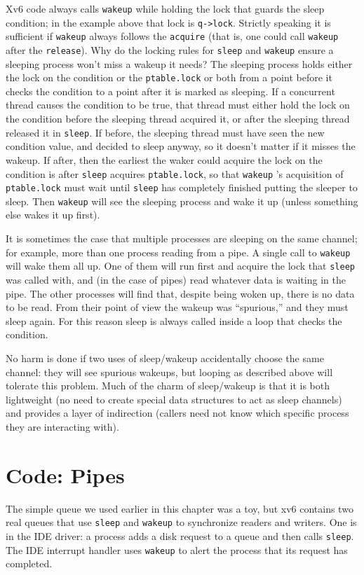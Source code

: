 Xv6 code always calls
\lstinline{wakeup}
while holding the lock that guards the sleep condition;
in the example above that lock is
\lstinline{q->lock}.
Strictly speaking it is sufficient if
\lstinline{wakeup}
always follows the
\lstinline{acquire}
(that is, one could call
\lstinline{wakeup}
after the
\lstinline{release}).
Why do the locking rules for 
\lstinline{sleep}
and
\lstinline{wakeup}
ensure a sleeping process won't miss a wakeup it needs?
The sleeping process holds either
the lock on the condition or the
\lstinline{ptable.lock} 
or both from a point before it checks the condition
to a point after it is marked as sleeping.
If a concurrent thread causes the condition to be true,
that thread must either hold the lock on the condition before the
sleeping thread acquired it, or after the sleeping
thread released it in
\lstinline{sleep}.
If before, the sleeping thread must have seen the new condition
value, and decided to sleep anyway, so it doesn't matter
if it misses the wakeup.
If after, then the earliest the waker could acquire the
lock on the condition is after
\lstinline{sleep}
acquires
\lstinline{ptable.lock},
so that
\lstinline{wakeup} 's
acquisition of
\lstinline{ptable.lock}
must wait until
\lstinline{sleep}
has completely finished putting the sleeper to sleep.
Then 
\lstinline{wakeup}
will see the sleeping process and wake it up
(unless something else wakes it up first).

It is sometimes the case that multiple processes are sleeping
on the same channel; for example, more than one process
reading from a pipe.
A single call to 
\lstinline{wakeup}
will wake them all up.
One of them will run first and acquire the lock that
\lstinline{sleep}
was called with, and (in the case of pipes) read whatever
data is waiting in the pipe.
The other processes will find that, despite being woken up,
there is no data to be read.
From their point of view the wakeup was ``spurious,'' and
they must sleep again.
For this reason sleep is always called inside a loop that
checks the condition.

No harm is done if two uses of sleep/wakeup accidentally
choose the same channel: they will see spurious wakeups,
but looping as described above will tolerate this problem.
Much of the charm of sleep/wakeup is that it is both
lightweight (no need to create special data
structures to act as sleep channels) and provides a layer
of indirection (callers need not know which specific process
they are interacting with).
\section{Code: Pipes}
The simple queue we used earlier in this chapter
was a toy, but xv6 contains two real queues
that use
\lstinline{sleep}
and
\lstinline{wakeup}
to synchronize readers and writers.
One is in the IDE driver: a process adds a disk request to a queue and then
calls
\lstinline{sleep}.
The IDE interrupt handler uses
\lstinline{wakeup}
to alert the process that its request has completed.

